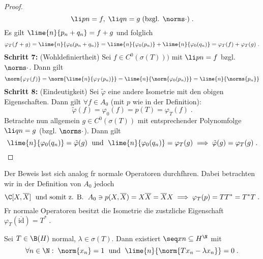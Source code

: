 \begin{proof}
	\[\li pn = f,\; \li qn = g \;\text{(bzgl. $\norms\cdot$)}\;.\]
	Es gilt \(\lime{n}{p_n + q_n}= f+g\) und folglich
	\[\varphi_T(f+g) = \lime{n}{\varphi_0(p_n + q_n)} = \lime{n}{\varphi_0(p_n)} + \lime{n}{\varphi_0(q_n)} = \varphi_T(f) + \varphi_T(g)\;.\]
	\textbf{Schritt 7:} (Wohldefiniertheit) Sei \(f\in C^0(\sigma(T)))\) mit \(\li pn = f\) bzgl. \(\norms\cdot\). Dann gilt 
	\[\norm{\varphi_T(f)} = \norm{\lime{n}{\varphi_T(p_n)}} = \lime{n}{\norm{\varphi_0(p_n)}} = \lime{n}{\norms{p_n}} \]
	\textbf{Schritt 8:} (Eindeutigkeit) Sei \(\tilde\varphi\) eine andere Isometrie mit den obigen Eigenschaften. Dann gilt \(\forall f \in A_0\) (mit $p$ wie in der Definition):
	\[\tilde \varphi(f) = \varphi_0(f) = p(T) = \varphi_T(f)\;.\]
	Betrachte nun allgemein \(g \in C^0(\sigma(T))\) mit entsprechender Polynomfolge \(\li qn = g\) (bzgl. $\norms\cdot$). Dann gilt
	\[\lime{n}{\varphi_0(q_n)} = \tilde\varphi(g) \;\text{ und }\; \lime{n}{\varphi_0(q_n)} =\varphi_T(g) \implies \tilde\varphi(g) = \varphi_T(g)\;.\]
	\end{proof}
	\begin{rem}
	  Der Beweis l\as sst sich analog f\us r normale Operatoren durchf\us hren. Dabei betrachten wir in der Definition von $A_0$ jedoch 
	  \[\C[X, \overline X] \;\text{ und somit z. B. }\; A_0 \ni p(X, \overline X) = X\overline X = \overline X X \implies \varphi_T(p) = TT^* = T^*T\;.\]
	  F\us r normale Operatoren besitzt die Isometrie die zus\as tzliche Eigenschaft
	  \(\varphi_T(\overline {\text{id}}) = T^*\;.\)
	  \end{rem}
	\begin{lemma}
		\label{spektrum_normal}
		Sei \(T\in \B(H)\) normal, \(\lambda \in \sigma(T)\). Dann existiert \(\seq xn \subseteq H^\N\) mit 
		\[\forall n \in \N: \; \norm{x_n} = 1 \;\text{ und }\;  \lime{n}{\norm{Tx_n - \lambda x_n}} = 0\;.\]
	\end{lemma}
